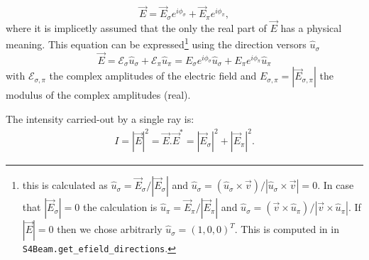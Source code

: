 \documentclass{iucr}
\begin{document}
\begin{equation}\label{eq:electricfieldray}
   \vec{E}= \vec{E}_\sigma e^{i \phi_\sigma} + \vec{E}_\pi e^{i \phi_\pi},
\end{equation}
where it is implicetly assumed that the only the real part of $\vec{E}$ has a physical meaning. This equation can be expressed\footnote{
this is calculated as  
$\hat{u}_\sigma = \vec{E}_\sigma/|\vec{E}_\sigma|$ and $\hat{u}_\sigma = (\hat{u}_\sigma \times \vec{v})/|\hat{u}_\sigma \times \vec{v}|=0$.
In case that $|\vec{E}_\sigma|=0$ the calculation is $\hat{u}_\pi = \vec{E}_\pi/|\vec{E}_\pi|$ and $\hat{u}_\sigma = (\vec{v} \times \hat{u}_\pi)/|\vec{v} \times \hat{u}_\pi|$. If $|\vec{E}|=0$ then we chose arbitrarly $\hat{u}_\sigma=(1,0,0)^T$. This is computed in in {\tt S4Beam.get\_efield\_directions}.
} using the direction versors $\hat{u}_\sigma$ 
\begin{equation}\label{eq:electricfieldray2}
   \vec{E}=
    \mathcal{E}_\sigma \hat{u}_\sigma + 
    \mathcal{E}_\pi \hat{u}_\pi
   =
   E_\sigma e^{i \phi_\sigma} \hat{u}_\sigma + E_\pi e^{i \phi_\pi} \hat{u}_\pi
\end{equation}
with $\mathcal{E}_{\sigma,\pi}$ the complex amplitudes of the electric field and $E_{\sigma,\pi}=|\vec{E}_{\sigma,\pi}|$ the modulus of the complex amplitudes (real).






The intensity carried-out by a single ray is:
\begin{eqnarray}
   I=|\vec{E}|^2 = \vec{E}.\vec{E}^* =
   |\vec{E}_\sigma|^2 + |\vec{E}_\pi|^2.
\end{eqnarray}
\end{document}
